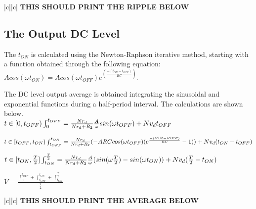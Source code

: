 \begin{center}
   \begin{tabular}{|c||c|}
      \hline    
       {\bf THIS SHOULD PRINT THE RIPPLE BELOW} \\
      \hline
        
   \end{tabular}
 \end{center}

\subsection{The Output DC Level}
\label{subsec:dclevel}

The $t_{ON}$ is calculated using the Newton-Raphson iterative method, starting with a function obtained through the following equation: $Acos(\omega t_{ON})=Acos(\omega t_{OFF})e^(\frac{-(t_{ON}-t_{OFF})}{RC})$.

The DC level output average is obtained integrating the sinusoidal and exponential functions during a half-period interval. The calculations are shown below.\\

$t\in[0,t_{OFF})\\
\int_{0}^{t_{OFF}}=\frac{N r_d}{N r_d + R_2}\frac{A}{\omega}sin(\omega t_{OFF})+N v_d t_{OFF}\\$

$t\in[t_{OFF},t_{ON})\\
\int_{t_{OFF}}^{t_{ON}}=\frac{N r_d}{N r_d + R_2}(-A R C cos(\omega t_{OFF})(e^{\frac{-({tON}-{tOFF})}{RC}}-1))+N v_d (t_{ON} - t_{OFF})\\$

$t\in[t_{ON},\frac{T}{2}]\\
\int_{t_{ON}}^{\frac{T}{2}}=\frac{N r_d}{N r_d + R_2}\frac{A}{\omega}(sin(\omega \frac{T}{2})-sin(\omega t_{ON}))+N v_d (\frac{T}{2}-t_{ON})\\$

$\overline{V}=\frac{\int_{0}^{t_{OFF}}+\int_{t_{OFF}}^{t_{ON}}+\int_{t_{ON}}^{\frac{T}{2}}}{\frac{T}{2}}$

\begin{center}
   \begin{tabular}{|c||c|}
      \hline    
       {\bf THIS SHOULD PRINT THE AVERAGE BELOW} \\
      \hline
        
   \end{tabular}
 \end{center}


